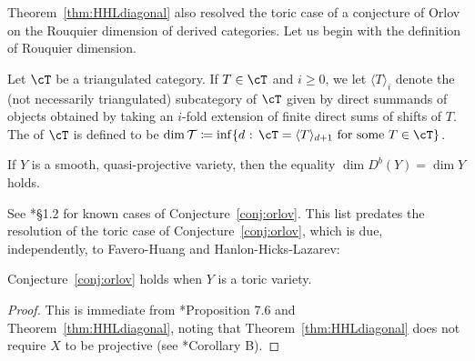 \documentclass{amsart}
\begin{document}
Theorem~\ref{thm:HHLdiagonal} also resolved the toric case of a conjecture of Orlov on the Rouquier dimension of derived categories. Let us begin with the definition of Rouquier dimension.

\begin{defn}
Let $\cT$ be a triangulated category. If $T \in \cT$ and $i \ge 0$, we let $\langle T \rangle_i$ denote the (not necessarily triangulated) subcategory of $\cT$ given by direct summands of objects obtained by
taking an $i$-fold extension of finite direct sums of shifts of $T$. The  of $\cT$ is defined to be $\dim\mathcal{T} \ce \inf \{ d \text{ : } \cT =  \langle T \rangle_{d+1} \text{ for some } T \in \cT\}$.
\end{defn}

\begin{conj}
\label{conj:orlov}
If $Y$ is a smooth, quasi-projective variety, then the equality $\dim D^b(Y) = \dim Y$ holds.
\end{conj}

See \cite{BC23}*{\S 1.2} for  known cases of Conjecture~\ref{conj:orlov}. This list predates the resolution of the toric case of Conjecture~\ref{conj:orlov}, which is due, independently, to Favero-Huang and Hanlon-Hicks-Lazarev:

\begin{thm}
Conjecture~\ref{conj:orlov} holds when $Y$ is a toric variety.
\end{thm}

\begin{proof}
This is immediate from \cite{Rouquier08}*{Proposition 7.6} and Theorem~\ref{thm:HHLdiagonal}, noting that Theorem~\ref{thm:HHLdiagonal} does not require $X$ to be projective (see \cite{HHL24}*{Corollary B}).
\end{proof}

\ifdefined\whole
\else


\end{document}
